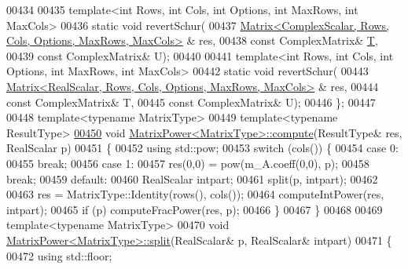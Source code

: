 \begin{DoxyCode}
00434 
00435     \textcolor{keyword}{template}<\textcolor{keywordtype}{int} Rows, \textcolor{keywordtype}{int} Cols, \textcolor{keywordtype}{int} Options, \textcolor{keywordtype}{int} MaxRows, \textcolor{keywordtype}{int} MaxCols>
00436     \textcolor{keyword}{static} \textcolor{keywordtype}{void} revertSchur(
00437         \hyperlink{group___core___module_class_eigen_1_1_matrix}{Matrix<ComplexScalar, Rows, Cols, Options, MaxRows, MaxCols>}
      & res,
00438         \textcolor{keyword}{const} ComplexMatrix& \hyperlink{group___sparse_core___module}{T},
00439         \textcolor{keyword}{const} ComplexMatrix& U);
00440 
00441     \textcolor{keyword}{template}<\textcolor{keywordtype}{int} Rows, \textcolor{keywordtype}{int} Cols, \textcolor{keywordtype}{int} Options, \textcolor{keywordtype}{int} MaxRows, \textcolor{keywordtype}{int} MaxCols>
00442     \textcolor{keyword}{static} \textcolor{keywordtype}{void} revertSchur(
00443         \hyperlink{group___core___module_class_eigen_1_1_matrix}{Matrix<RealScalar, Rows, Cols, Options, MaxRows, MaxCols>}
      & res,
00444         \textcolor{keyword}{const} ComplexMatrix& T,
00445         \textcolor{keyword}{const} ComplexMatrix& U);
00446 \};
00447 
00448 \textcolor{keyword}{template}<\textcolor{keyword}{typename} MatrixType>
00449 \textcolor{keyword}{template}<\textcolor{keyword}{typename} ResultType>
\hyperlink{class_eigen_1_1_matrix_power_aa1258393dc13acd6e401e000f99b915f}{00450} \textcolor{keywordtype}{void} \hyperlink{class_eigen_1_1_matrix_power_aa1258393dc13acd6e401e000f99b915f}{MatrixPower<MatrixType>::compute}(ResultType& res, RealScalar p)
00451 \{
00452   \textcolor{keyword}{using} std::pow;
00453   \textcolor{keywordflow}{switch} (cols()) \{
00454     \textcolor{keywordflow}{case} 0:
00455       \textcolor{keywordflow}{break};
00456     \textcolor{keywordflow}{case} 1:
00457       res(0,0) = pow(m\_A.coeff(0,0), p);
00458       \textcolor{keywordflow}{break};
00459     \textcolor{keywordflow}{default}:
00460       RealScalar intpart;
00461       split(p, intpart);
00462 
00463       res = MatrixType::Identity(rows(), cols());
00464       computeIntPower(res, intpart);
00465       \textcolor{keywordflow}{if} (p) computeFracPower(res, p);
00466   \}
00467 \}
00468 
00469 \textcolor{keyword}{template}<\textcolor{keyword}{typename} MatrixType>
00470 \textcolor{keywordtype}{void} \hyperlink{class_eigen_1_1_matrix_power}{MatrixPower<MatrixType>::split}(RealScalar& p, RealScalar& intpart)
00471 \{
00472   \textcolor{keyword}{using} std::floor;

\end{DoxyCode}
